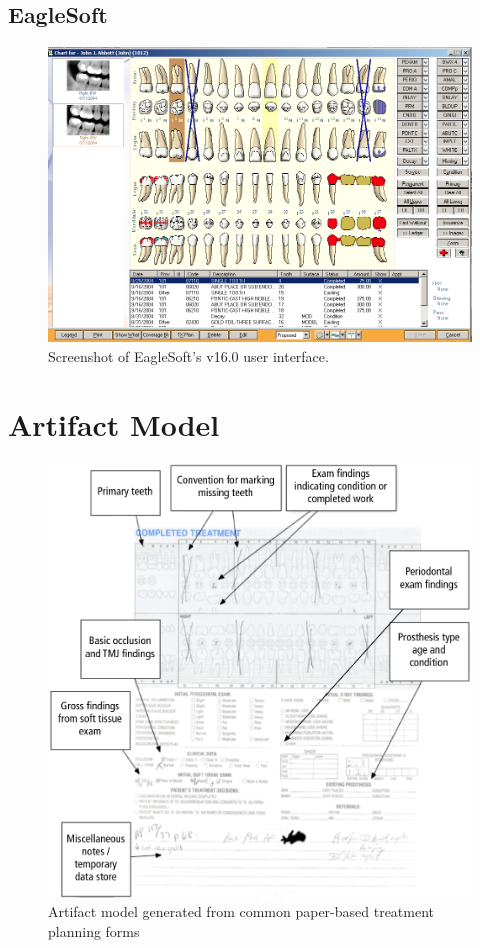 \documentclass[11pt]{article}
\begin{document}
\newpage
\subsection{EagleSoft}
\label{ES}
\begin{figure}[h]
\begin{center}
\includegraphics[width=\textwidth]{esss.png}
\end{center}
\caption{Screenshot of EagleSoft's v16.0 user interface.}
\end{figure}

\newpage

\section{Artifact Model}
\label{artifact}
\begin{figure}[h!b]
\begin{center}
\includegraphics[width=\textwidth]{artifactmodel.png}
\end{center}
\caption{Artifact model generated from common paper-based treatment planning forms}
\end{figure}
\newpage
\end{document}
